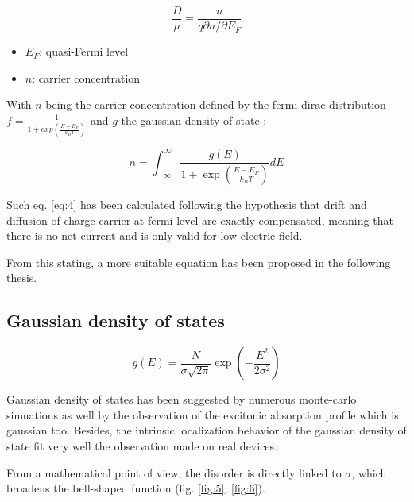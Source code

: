\begin{equation}
    \frac{D}{\mu}=\frac{n}{q \partial n / \partial E_{F}}
    \label{eq:3}
\end{equation}

\begin{itemize}
    \setlength\itemsep{0.0em}
    \item $E_F$: quasi-Fermi level
    \item $n$: carrier concentration
\end{itemize}

With $n$ being the carrier concentration defined by the fermi-dirac distribution $f = \frac{1}{1 + exp\left(\frac{E - E_F}{k_BT}\right)}$ and $g$ the gaussian density of state \cite{generalied_quasi}:

\begin{equation}
    n=\int_{-\infty}^{\infty} \frac{g(E)}{1+\exp \left(\frac{E-E_{F}}{k_{B} T}\right)} d E
    \label{eq:4}
\end{equation}

Such eq. \ref{eq:4} has been calculated following the hypothesis that drift and diffusion of charge carrier at fermi level are exactly compensated, meaning that there is no net current and is only valid for low electric field.

From this stating, a more suitable equation has been proposed in the following thesis.

\subsection{Gaussian density of states}

\begin{equation}
    g(E)=\frac{N}{\sigma \sqrt{2 \pi}} \exp \left(-\frac{E^{2}}{2 \sigma^{2}}\right)
    \label{eq:5}
\end{equation}

Gaussian density of states has been suggested by numerous monte-carlo simuations \cite{DOS_monte_carlo} as well by the observation of the excitonic absorption profile which is gaussian too. Besides, the intrinsic localization behavior of the gaussian density of state fit very well the observation made on real devices.

From a mathematical point of view, the disorder is directly linked to $\sigma$, which broadens the bell-shaped function (fig. \ref{fig:5}, \ref{fig:6}).

